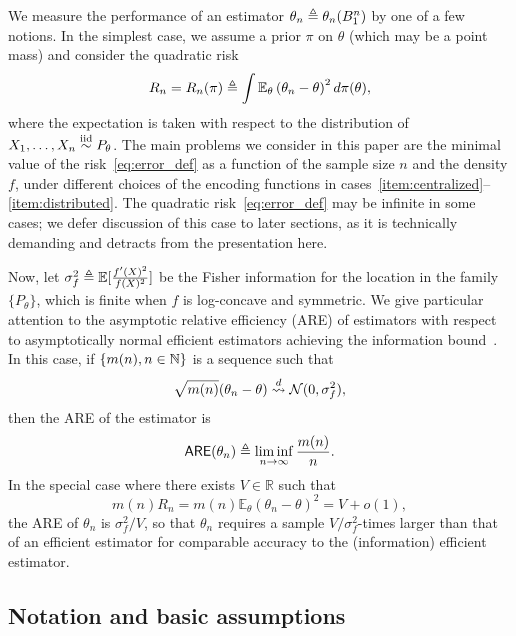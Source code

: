We measure the performance of an estimator $\theta_n \triangleq
\theta_n(B_1^n)$ by one of a few notions. In the simplest case,
we assume a prior $\pi$ on $\theta$ (which may be a point
mass) and consider the quadratic risk
\begin{equation}
  \label{eq:error_def}
  R_n = R_n(\pi) \triangleq \int \mathbb{E}_\theta\left({\theta}_n - \theta \right)^2
  d\pi(\theta),
\end{equation}
where the expectation is taken with respect to the distribution of
$X_1,\ldots,X_n \stackrel{\textup{iid}}{\sim} P_\theta$.  The main problems we consider in this
paper are the minimal value of the risk~\eqref{eq:error_def} as a function
of the sample size $n$ and the density $f$, under different choices of the
encoding functions in
cases~\eqref{item:centralized}--\eqref{item:distributed}.
The quadratic risk~\eqref{eq:error_def} may be infinite in some cases;
we defer discussion of this case to later sections, as it is technically
demanding and detracts from the presentation here.

Now, let $\sigma_f^2 \triangleq \mathbb{E}[\frac{f'(X)^2}{f(X)^2}]$ be the Fisher
information for the location in the family $\{P_\theta\}$, which is finite
when $f$ is log-concave and symmetric. We give particular attention to the
asymptotic relative efficiency (ARE) of estimators with respect to
asymptotically normal efficient estimators achieving the information
bound~\cite{VanDerVaart98}. In this case,
if $\{m(n), n \in \mathbb{N}\}$ is a sequence such that
\begin{equation*}
  \sqrt{m(n)} (\theta_n - \theta) \stackrel{d}{\rightsquigarrow} \mathcal{N}(0, \sigma_f^2),
\end{equation*}
then the ARE of the estimator is~\cite[Def.~6.6.6]{LehmannCa98}
\begin{equation}
  \label{eqn:are-def}
  \mathsf{ARE}({\theta}_n) \triangleq
  \liminf_{n\rightarrow \infty} \frac{m(n)}{n}.
\end{equation}
In the special case where there exists $V \in \mathbb R$ such that
\begin{equation*}
  m(n) R_n =
  m(n) \mathbb E_\theta\left({\theta}_n - \theta \right)^2 = V + o(1),
\end{equation*}
the ARE of ${\theta}_n$ is $\sigma_f^2/V$, so that $\theta_n$ requires a
sample $V / \sigma_f^2$-times larger than that of an efficient estimator for
comparable accuracy to the (information) efficient estimator.

\subsection*{Notation and basic assumptions}

